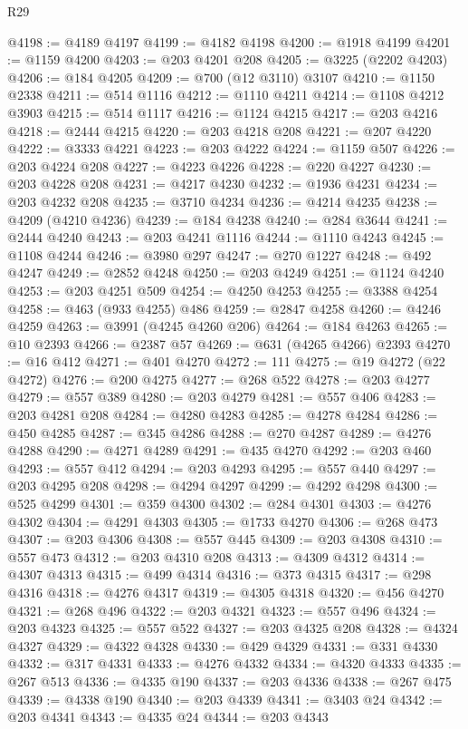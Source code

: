 \begin{lexlean}{R29}
\begin{coremodule}
@4198 := @4189 @4197
@4199 := @4182 @4198
@4200 := @1918 @4199
@4201 := @1159 @4200
@4203 := @203 @4201 @208
@4205 := @3225 (@2202 @4203)
@4206 := @184 @4205
@4209 := @700 (@12 @3110) @3107
@4210 := @1150 @2338
@4211 := @514 @1116
@4212 := @1110 @4211
@4214 := @1108 @4212 @3903
@4215 := @514 @1117
@4216 := @1124 @4215
@4217 := @203 @4216
@4218 := @2444 @4215
@4220 := @203 @4218 @208
@4221 := @207 @4220
@4222 := @3333 @4221
@4223 := @203 @4222
@4224 := @1159 @507
@4226 := @203 @4224 @208
@4227 := @4223 @4226
@4228 := @220 @4227
@4230 := @203 @4228 @208
@4231 := @4217 @4230
@4232 := @1936 @4231
@4234 := @203 @4232 @208
@4235 := @3710 @4234
@4236 := @4214 @4235
@4238 := @4209 (@4210 @4236)
@4239 := @184 @4238
@4240 := @284 @3644
@4241 := @2444 @4240
@4243 := @203 @4241 @1116
@4244 := @1110 @4243
@4245 := @1108 @4244
@4246 := @3980 @297
@4247 := @270 @1227
@4248 := @492 @4247
@4249 := @2852 @4248
@4250 := @203 @4249
@4251 := @1124 @4240
@4253 := @203 @4251 @509
@4254 := @4250 @4253
@4255 := @3388 @4254
@4258 := @463 (@933 @4255) @486
@4259 := @2847 @4258
@4260 := @4246 @4259
@4263 := @3991 (@4245 @4260 @206)
@4264 := @184 @4263
@4265 := @10 @2393
@4266 := @2387 @57
@4269 := @631 (@4265 @4266) @2393
@4270 := @16 @412
@4271 := @401 @4270
@4272 := 111
@4275 := @19 @4272 (@22 @4272)
@4276 := @200 @4275
@4277 := @268 @522
@4278 := @203 @4277
@4279 := @557 @389
@4280 := @203 @4279
@4281 := @557 @406
@4283 := @203 @4281 @208
@4284 := @4280 @4283
@4285 := @4278 @4284
@4286 := @450 @4285
@4287 := @345 @4286
@4288 := @270 @4287
@4289 := @4276 @4288
@4290 := @4271 @4289
@4291 := @435 @4270
@4292 := @203 @460
@4293 := @557 @412
@4294 := @203 @4293
@4295 := @557 @440
@4297 := @203 @4295 @208
@4298 := @4294 @4297
@4299 := @4292 @4298
@4300 := @525 @4299
@4301 := @359 @4300
@4302 := @284 @4301
@4303 := @4276 @4302
@4304 := @4291 @4303
@4305 := @1733 @4270
@4306 := @268 @473
@4307 := @203 @4306
@4308 := @557 @445
@4309 := @203 @4308
@4310 := @557 @473
@4312 := @203 @4310 @208
@4313 := @4309 @4312
@4314 := @4307 @4313
@4315 := @499 @4314
@4316 := @373 @4315
@4317 := @298 @4316
@4318 := @4276 @4317
@4319 := @4305 @4318
@4320 := @456 @4270
@4321 := @268 @496
@4322 := @203 @4321
@4323 := @557 @496
@4324 := @203 @4323
@4325 := @557 @522
@4327 := @203 @4325 @208
@4328 := @4324 @4327
@4329 := @4322 @4328
@4330 := @429 @4329
@4331 := @331 @4330
@4332 := @317 @4331
@4333 := @4276 @4332
@4334 := @4320 @4333
@4335 := @267 @513
@4336 := @4335 @190
@4337 := @203 @4336
@4338 := @267 @475
@4339 := @4338 @190
@4340 := @203 @4339
@4341 := @3403 @24
@4342 := @203 @4341
@4343 := @4335 @24
@4344 := @203 @4343

\end{coremodule}
\end{lexlean}

